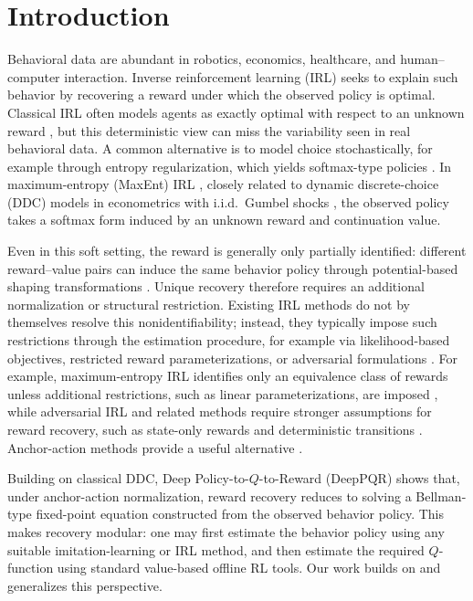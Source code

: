 \documentclass{article}
\newcommand{\1}{\mathbbm{1}}
\begin{document}
 

 \section{Introduction}
\label{sec:motivation}
Behavioral data are abundant in robotics, economics, healthcare, and
human--computer interaction. Inverse reinforcement learning (IRL) seeks to
explain such behavior by recovering a reward under which the observed policy is
optimal. Classical IRL often models agents as exactly optimal with respect to
an unknown reward \citep{ng2000algorithms,abbeel2004apprenticeship}, but this
deterministic view can miss the variability seen in real behavioral data. A
common alternative is to model choice stochastically, for example through
entropy regularization, which yields softmax-type policies
\citep{ziebart2008maximum,ziebart2010modeling,haarnoja2017reinforcement}. In
maximum-entropy (MaxEnt) IRL \citep{ziebart2008maximum}, closely related to
dynamic discrete-choice (DDC) models in econometrics with i.i.d.\ Gumbel shocks
\citep{rust1987optimal}, the observed policy takes a softmax form induced by an
unknown reward and continuation value.

Even in this soft setting, the reward is generally only partially identified:
different reward--value pairs can induce the same behavior policy through
potential-based shaping transformations
\citep{ng1999policy,cao2021identifiability,skalse2023invariance,skalse2024partial}.
Unique recovery therefore requires an additional normalization or structural
restriction. Existing IRL methods do not by themselves resolve this
nonidentifiability; instead, they typically impose such restrictions through the
estimation procedure, for example via likelihood-based objectives, restricted
reward parameterizations, or adversarial formulations
\citep{ziebart2008maximum,levine2011nonlinear,wulfmeier2015deep,ho2016gail,fu2018airl,snoswell2020revisiting}.
For example, maximum-entropy IRL identifies only an equivalence class of
rewards unless additional restrictions, such as linear parameterizations, are
imposed \citep{ziebart2008maximum}, while adversarial IRL and related methods
require stronger assumptions for reward recovery, such as state-only rewards
and deterministic transitions \citep{fu2018airl}. Anchor-action methods provide
a useful alternative
\citep{rust1987optimal,hotz1993conditional,aguirregabiria2010dynamic,geng2020deep}.

Building on classical DDC, Deep Policy-to-$Q$-to-Reward (DeepPQR)  \citep{geng2020deep} shows that, under anchor-action normalization,
reward recovery reduces to solving a Bellman-type fixed-point equation
constructed from the observed behavior policy. This makes recovery modular:
one may first estimate the behavior policy using any suitable imitation-learning
or IRL method, and then estimate the required \(Q\)-function using standard
value-based offline RL tools. Our work builds on and generalizes this
perspective.
\end{document}

